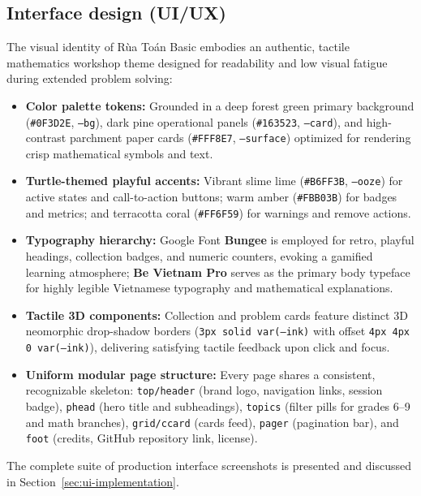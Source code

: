 \subsection{Interface design (UI/UX)}
The visual identity of Rùa Toán Basic embodies an authentic, tactile mathematics workshop theme designed
for readability and low visual fatigue during extended problem solving:
\begin{itemize}
  \item \textbf{Color palette tokens:} Grounded in a deep forest green primary background (\texttt{\#0F3D2E}, \texttt{--bg}),
        dark pine operational panels (\texttt{\#163523}, \texttt{--card}), and high-contrast parchment paper cards
        (\texttt{\#FFF8E7}, \texttt{--surface}) optimized for rendering crisp mathematical symbols and text.
  \item \textbf{Turtle-themed playful accents:} Vibrant slime lime (\texttt{\#B6FF3B}, \texttt{--ooze}) for active
        states and call-to-action buttons; warm amber (\texttt{\#FBB03B}) for badges and metrics; and terracotta coral
        (\texttt{\#FF6F59}) for warnings and remove actions.
  \item \textbf{Typography hierarchy:} Google Font \textbf{Bungee} is employed for retro, playful headings, collection
        badges, and numeric counters, evoking a gamified learning atmosphere; \textbf{Be Vietnam Pro} serves as the
        primary body typeface for highly legible Vietnamese typography and mathematical explanations.
  \item \textbf{Tactile 3D components:} Collection and problem cards feature distinct 3D neomorphic drop-shadow
        borders (\texttt{3px solid var(--ink)} with offset \texttt{4px 4px 0 var(--ink)}), delivering satisfying
        tactile feedback upon click and focus.
  \item \textbf{Uniform modular page structure:} Every page shares a consistent, recognizable skeleton:
        \texttt{top/header} (brand logo, navigation links, session badge), \texttt{phead} (hero title and subheadings),
        \texttt{topics} (filter pills for grades 6--9 and math branches), \texttt{grid/ccard} (cards feed),
        \texttt{pager} (pagination bar), and \texttt{foot} (credits, GitHub repository link, license).
\end{itemize}
The complete suite of production interface screenshots is presented and discussed in Section~\ref{sec:ui-implementation}.

